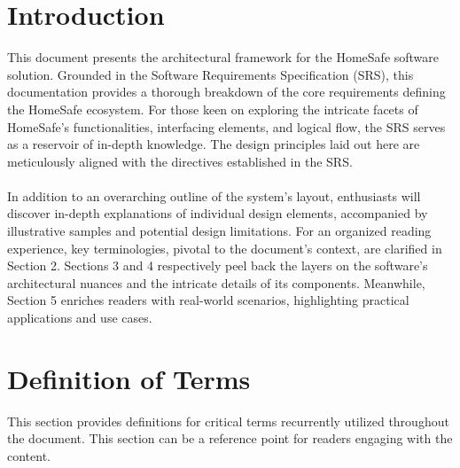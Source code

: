 \documentclass{article}
\begin{document}
\section{Introduction}
This document presents the architectural framework for the HomeSafe software solution. Grounded in the Software Requirements Specification (SRS), this documentation provides a thorough breakdown of the core requirements defining the HomeSafe ecosystem. For those keen on exploring the intricate facets of HomeSafe’s functionalities, interfacing elements, and logical flow, the SRS serves as a reservoir of in-depth knowledge. The design principles laid out here are meticulously aligned with the directives established in the SRS. \\ \\
In addition to an overarching outline of the system's layout, enthusiasts will discover in-depth explanations of individual design elements, accompanied by illustrative samples and potential design limitations. For an organized reading experience, key terminologies, pivotal to the document's context, are clarified in Section 2. Sections 3 and 4 respectively peel back the layers on the software's architectural nuances and the intricate details of its components. Meanwhile, Section 5 enriches readers with real-world scenarios, highlighting practical applications and use cases.

\section{Definition of Terms}
This section provides definitions for critical terms recurrently utilized throughout the document. This section can be a reference point for readers engaging with the content.
\end{document}
